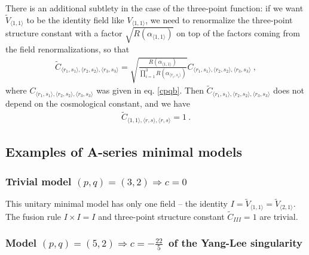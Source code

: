 \documentclass[12pt, a4paper, notitlepage, twoside]{report}
\numberwithin{equation}{section}
\theoremstyle{break}
\begin{document}
There is an additional subtlety in the case of the three-point function: if we want $\tilde{V}_{\langle 1,1 \rangle}$ to be the identity field like $V_{\langle 1,1 \rangle}$, we need to renormalize the three-point structure constant with a factor $\sqrt{R(\alpha_{\langle 1,1 \rangle})}$ on top of the factors coming from the field renormalizations, so that 
\begin{align}
 \tilde{C}_{\langle r_1,s_1\rangle ,\langle r_2,s_2\rangle ,\langle r_3,s_3 \rangle} = \sqrt{\frac{R(\alpha_{\langle 1,1 \rangle})}{\prod_{i=1}^3 R(\alpha_{\langle r_i,s_i \rangle})}}  C_{\langle r_1,s_1\rangle ,\langle r_2,s_2\rangle ,\langle r_3,s_3 \rangle}\ ,
\label{tcc}
\end{align}
where $C_{\langle r_1,s_1\rangle ,\langle r_2,s_2\rangle ,\langle r_3,s_3 \rangle}$ was given in eq. \eqref{cpqb}.
Then $\tilde{C}_{\langle r_1,s_1\rangle ,\langle r_2,s_2\rangle ,\langle r_3,s_3 \rangle}$ does not depend on the cosmological constant, and we have 
\begin{align}
\boxed{ \tilde{C}_{\langle 1,1\rangle , \langle r,s \rangle,\langle r,s \rangle}=1}\ .
\end{align}


\subsection{Examples of A-series minimal models}

\subsubsection{Trivial model $(p,q)=(3,2) \Rightarrow c = 0$}

This unitary minimal model has only one field -- the identity $I=\tilde{V}_{\langle 1,1 \rangle}=\tilde{V}_{\langle 2,1 \rangle}$.
The fusion rule $I\times I = I$ and three-point structure constant $\tilde{C}_{III} = 1$ are trivial.

\subsubsection{Model $(p,q)=(5,2) \Rightarrow c=-\tfrac{22}{5}$\ of the Yang-Lee singularity}
\end{document}
